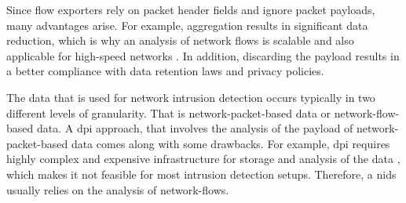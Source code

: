 Since flow exporters rely on packet header fields and ignore packet payloads, many advantages arise. For example, aggregation results in significant data reduction, which is why an analysis of network flows is scalable and also applicable for high-speed networks \cite{hof_2014}. In addition, discarding the payload results in a better compliance with data retention laws and privacy policies.

The data that is used for network intrusion detection occurs typically in two different levels of granularity. That is network-packet-based data or network-flow-based data. A \acrfull{dpi} approach, that involves the analysis of the payload of network-packet-based data comes along with some drawbacks. For example, \acrshort{dpi} requires highly complex and expensive infrastructure for storage and analysis of the data \cite{hof_2014}, which makes it not feasible for most intrusion detection setups. Therefore, a \acrshort{nids} usually relies on the analysis of network-flows.



